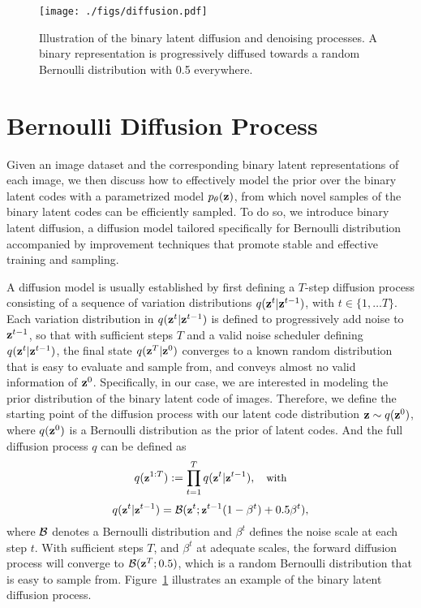 \documentclass[10pt,twocolumn,letterpaper]{article}
\begin{document}
\begin{figure}[b]
    \centering
	\texttt{[image: ./figs/diffusion.pdf]}
\caption{Illustration of the binary latent diffusion and denoising processes. A binary representation is progressively diffused towards a random Bernoulli distribution with 0.5 everywhere. }
\label{fig:diffusion}
\end{figure}

\section{Bernoulli Diffusion Process}
\label{bdiffusion}
Given an image dataset and the corresponding binary latent representations of each image, we then discuss how to effectively model the prior over the binary latent codes with a parametrized model $p_\theta(\textbf{z})$, from which novel samples of the binary latent codes can be efficiently sampled. 
To do so, we introduce binary latent diffusion, a diffusion model tailored specifically for Bernoulli distribution accompanied by improvement techniques that promote stable and effective training and sampling.

A diffusion model is usually established by first defining a $T$-step diffusion process consisting of a sequence of variation distributions $q(\textbf{z}^t | \textbf{z}^{t-1})$, with $t \in \{1, \dots T\}$.
Each variation distribution in $q(\textbf{z}^t | \textbf{z}^{t-1})$ is defined to progressively add noise to $\textbf{z}^{t-1}$, so that with sufficient steps $T$ and a valid noise scheduler defining $q(\textbf{z}^t | \textbf{z}^{t-1})$, the final state $q(\textbf{z}^T | \textbf{z}^{0})$ converges to a known random distribution that is easy to evaluate and sample from, and conveys almost no valid information of $\textbf{z}^0$. 
Specifically, in our case, we are interested in modeling the prior distribution of the binary latent code of images. 
Therefore, we define the starting point of the diffusion process with our latent code distribution $\textbf{z} \sim q(\textbf{z}^0)$, where $q(\textbf{z}^0)$ is a Bernoulli distribution as the prior of latent codes. 
And the full diffusion process $q$ can be defined as 
\begin{equation}
\small
    q(\textbf{z}^{1:T}) := \prod_{t=1}^{T} q(\textbf{z}^t | \textbf{z}^{t-1}), \quad \text{with}
\end{equation}
\begin{equation}
\small
    q(\textbf{z}^t| \textbf{z}^{t-1}) = \mathcal{B}(\textbf{z}^t; \textbf{z}^{t-1}(1 - \beta^t) + 0.5 \beta^t),
\end{equation}
where $\mathcal{B}$ denotes a Bernoulli distribution and $\beta^t$ defines the noise scale at each step $t$. 
With sufficient steps $T$, and $\beta^t$ at adequate scales, the forward diffusion process will converge to $\mathcal{B}(\textbf{z}^T; 0.5)$, which is a random Bernoulli distribution that is easy to sample from. Figure~\ref{fig:diffusion} illustrates an example of the binary latent diffusion process.
\end{document}

